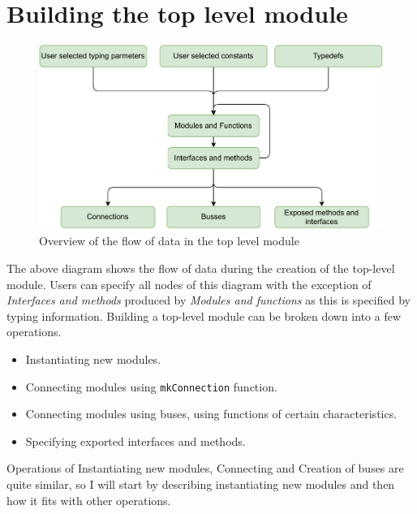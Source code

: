 \documentclass[12pt]{report}
\begin{document}
\section{Building the top level module}
\begin{figure}[!h]
    \centering
    \caption{Overview of the flow of data in the top level module}

    \includegraphics[width=1.0\columnwidth]{pdfExports/LargeMap-dataFlow.drawio.pdf}
\end{figure}
The above diagram shows the flow of data during the creation of the top-level module. Users can specify all nodes of this diagram with the exception of \emph{Interfaces and methods} produced by \emph{Modules and functions} as this is specified by typing information. 
Building a top-level module can be broken down into a few operations. 
\begin{itemize} 
   \item Instantiating new modules. 
   \item Connecting modules using \verb!mkConnection! function. 
   \item Connecting modules using buses, using functions of certain characteristics. 
   \item Specifying exported interfaces and methods. 
\end{itemize}  
Operations of Instantiating new modules, Connecting and Creation of buses are quite similar, so I will start by describing instantiating new modules and then how it fits with other operations. 
\end{document}
